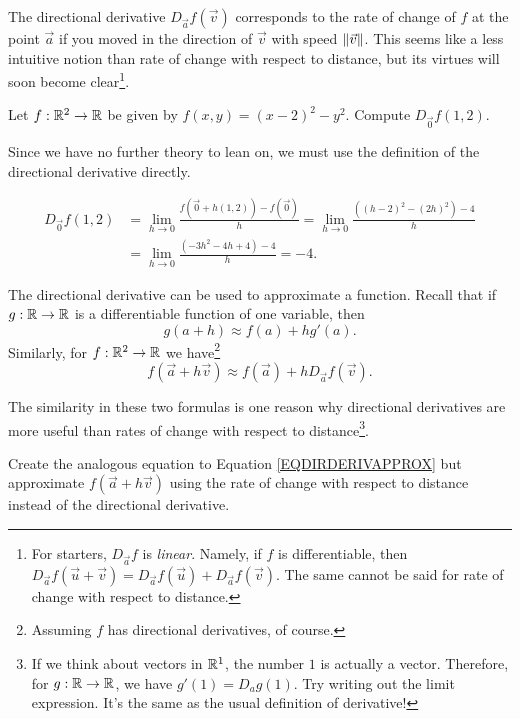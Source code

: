 The directional derivative $D_{\vec a}f(\vec v)$ corresponds to the rate of change of $f$ at the point $\vec a$
if you moved in the direction of $\vec v$ with speed $\lVert\vec v\rVert$.  This seems 
like a less intuitive notion than rate of change with respect to distance, but its virtues will
soon become clear\footnote{ For starters, $D_{\vec a}f$ is \emph{linear}.  Namely, if $f$ is differentiable,
then $D_{\vec a}f(\vec u+\vec v)=D_{\vec a}f(\vec u)+D_{\vec a}f(\vec v)$.  The same cannot
be said for rate of change with respect to distance.}.

\begin{example}
	Let $f:\mathbb{R}^2\to\mathbb{R}$ be given by $f(x,y)=(x-2)^2-y^2$.  Compute $D_{\vec 0}f(1,2)$.

	Since we have no further theory to lean on, we must use the definition of the directional
	derivative directly.

	\begin{align*}
		D_{\vec 0}f(1,2) &= \lim_{h\to0}\frac{f(\vec 0+h(1,2))-f(\vec 0)}{h}
		=\lim_{h\to0}\frac{((h-2)^2-(2h)^2)-4}{h}\\
		&=\lim_{h\to0}\frac{(-3h^2-4h+4)-4}{h}=-4.
	\end{align*}
\end{example}

The directional derivative can be used to approximate a function.  Recall that if $g:\mathbb{R}\to\mathbb{R}$ is
a differentiable function of one variable, then
\[
	g(a+h)\approx f(a) + hg'(a).
\]
Similarly, for $f:\mathbb{R}^2\to\mathbb{R}$ we have\footnote{ Assuming $f$ has directional derivatives, of course.}
\begin{equation}
	\label{EQDIRDERIVAPPROX}
	f(\vec a+h\vec v)\approx f(\vec a)+hD_{\vec a}f(\vec v).
\end{equation}

The similarity in these two formulas is one reason
why directional derivatives are more useful than rates of change with respect to distance\footnote{
	If we think about vectors in $\mathbb{R}^1$, the number $1$ is actually a vector.  Therefore,
	for $g:\mathbb{R}\to\mathbb{R}$, we have $g'(1)=D_{a}g(1)$.  Try writing out the limit expression.  It's the same
	as the usual definition of derivative!
	}.

\begin{exercise}
	Create the analogous equation to Equation \eqref{EQDIRDERIVAPPROX} but approximate
	$f(\vec a+h\vec v)$ using the rate of change with respect to distance instead of the
	directional derivative.
\end{exercise}


